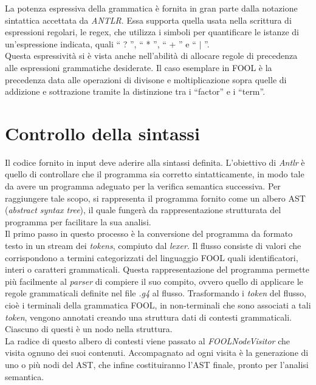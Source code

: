 \documentclass{scrreprt}
\begin{document}
La potenza espressiva della grammatica è fornita in gran parte dalla notazione sintattica accettata da 
\textit{ANTLR}. Essa supporta quella usata nella scrittura di espressioni regolari, le regex, che utilizza i 
simboli per quantificare le istanze di un’espressione indicata, quali `` ? '', `` * '', `` + '' e `` $\mid$ ''. \\

Questa espressività si è vista anche nell'abilità di allocare regole di precedenza alle espressioni 
grammatiche desiderate. Il caso esemplare in FOOL è la precedenza data alle operazioni di divisone e 
moltiplicazione sopra quelle di addizione e sottrazione tramite la distinzione tra i ``factor'' e i ``term''. 


\section{Controllo della sintassi}

Il codice fornito in input deve aderire alla sintassi definita. L’obiettivo di \textit{Antlr} è quello di controllare che il programma sia 
corretto sintatticamente, in modo tale da avere un programma adeguato per la 
verifica semantica successiva. Per raggiungere tale scopo, si rappresenta il programma 
fornito come un albero AST (\textit{abstract syntax tree}), il quale fungerà da rappresentazione strutturata 
del programma per facilitare la sua analisi. \\

Il primo passo in questo processo è la conversione del programma da formato testo in un stream dei 
\textit{tokens}, compiuto dal \textit{lexer}. Il flusso consiste di valori che corrispondono a termini categorizzati del 
linguaggio FOOL quali identificatori, interi o caratteri grammaticali. Questa rappresentazione del 
programma permette più facilmente al \textit{parser} di compiere il suo compito, ovvero quello di applicare 
le regole grammaticali definite nel file \textit{.g4} al flusso. Trasformando i \textit{token} del flusso, cioè i terminali 
della grammatica FOOL, in non-terminali che sono associati a tali \textit{token}, vengono annotati creando 
una struttura dati di contesti grammaticali. Ciascuno di questi è un nodo nella struttura. \\

La radice di questo albero di contesti viene passato al \textit{FOOLNodeVisitor} che visita ognuno dei suoi 
contenuti. Accompagnato ad ogni visita è la generazione di uno o più nodi del AST, che infine 
costituiranno l’AST finale, pronto per l’analisi semantica. \\
\end{document}
